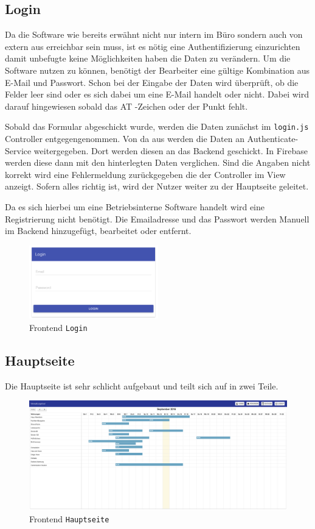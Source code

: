 \subsection{Login}
Da die Software wie bereits erwähnt nicht nur intern im Büro sondern auch von extern aus erreichbar sein muss, ist es nötig eine Authentifizierung einzurichten damit unbefugte keine Möglichkeiten haben die Daten zu verändern. Um die Software nutzen zu können, benötigt der Bearbeiter eine gültige Kombination aus E-Mail und Passwort. Schon bei der Eingabe der Daten wird überprüft, ob die Felder leer sind oder es sich dabei um eine E-Mail handelt oder nicht. Dabei wird darauf hingewiesen sobald das AT -Zeichen oder der Punkt fehlt.

Sobald das Formular abgeschickt wurde, werden die Daten zunächst im \texttt{login.js} Controller entgegengenommen. Von da aus werden die Daten an Authenticate-Service weitergegeben. Dort werden diesen an das Backend geschickt. In Firebase werden diese dann mit den hinterlegten Daten verglichen. Sind die Angaben nicht korrekt wird eine Fehlermeldung zurückgegeben die der Controller im View anzeigt. Sofern alles richtig ist, wird der Nutzer weiter zu der Hauptseite geleitet.

Da es sich hierbei um eine Betriebsinterne Software handelt wird eine Registrierung nicht benötigt. Die Emailadresse und das Passwort werden Manuell im Backend hinzugefügt, bearbeitet oder entfernt.

\begin{figure}[H]
\centering\includegraphics[width=0.5\textwidth]{images/frontend_login.png}
\caption{Frontend \texttt{Login}}
\label{Login}
\end{figure}

\subsection{Hauptseite}
Die Hauptseite ist sehr schlicht aufgebaut und teilt sich auf in zwei Teile.

\begin{figure}[H]
\centering\includegraphics[width=1\textwidth]{images/frontend_mainpage.png}
\caption{Frontend \texttt{Hauptseite}}
\label{Hauptseite}
\end{figure}

